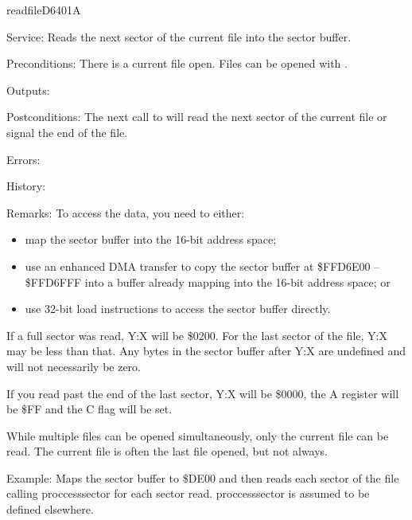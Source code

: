 \newpage
\begin{hyppotrap}{readfile}{D640}{1A}
\item [Service:]
  Reads the next sector of the current file into the sector buffer.
\item [Preconditions:]
  There is a current file open. Files can be opened with .
\item [Outputs:]
\item [Postconditions:]
  The next call to  will read the next sector of the current
  file or signal the end of the file.
\item [Errors:]
\item [History:]
\item [Remarks:]
  To access the data, you need to either:
  \begin{itemize}
    \item map the sector buffer into the 16-bit address space;
    \item use an enhanced DMA transfer to copy the sector buffer at
          \$FFD6E00 -- \$FFD6FFF into a buffer already mapping into the 16-bit
          address space; or
    \item use 32-bit load instructions to access the sector buffer directly.
  \end{itemize}

  If a full sector was read, Y:X will be \$0200. For the last sector of the
  file, Y:X may be less than that. Any bytes in the sector buffer after Y:X are
  undefined and will not necessarily be zero.

  If you read past the end of the last sector, Y:X will be \$0000, the A
  register will be \$FF and the C flag will be set.

  While multiple files can be opened simultaneously, only the current file can
  be read. The current file is often the last file opened, but not always.
\item [Example:]
  Maps the sector buffer to \$DE00 and then reads each sector of the file
  calling proccesssector for each sector read. proccesssector is assumed to be
  defined elsewhere.
\end{hyppotrap}


